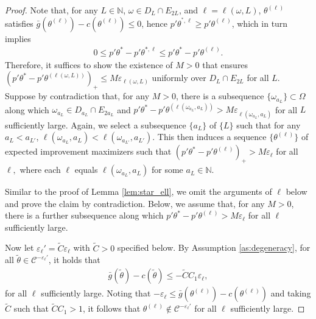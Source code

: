 \documentclass[letterpaper,11pt]{article}
\theoremstyle{myplain}
\theoremstyle{mydefinition}
\theoremstyle{myremark}
\numberwithin{equation}{section}
\numberwithin{figure}{section}
\begin{document}
\begin{appendix}
\begin{proof}
Note that, for any $L\in\mathbb N$, $\omega\in D_L\cap E_{2L}$, and $\ell=\ell(\omega,L)$, $\theta^{(\ell)}$ satisfies $\bar g(\theta^{(\ell)})-c(\theta^{(\ell)})\le 0$, hence $p'\theta^{^*,\ell}\ge p'\theta^{(\ell)}$, which in turn implies
\begin{align}
0\le p'\theta^*-p'\theta^{*,\ell}\le p'\theta^*-p'\theta^{(\ell)}.
\end{align}
Therefore, it suffices to show the existence of $M>0$ that ensures $(p'\theta^*-p'\theta^{(\ell(\omega,L))})_+\le M\varepsilon_{\ell(\omega,L)}$ uniformly over $D_L\cap E_{2L}$ for all $L$.
Suppose by contradiction that, for any $M>0$, there is a  subsequence $\{\omega_{a_L}\}\subset \Omega$ along which $\omega_{a_L}\in D_{a_L}\cap E_{2a_L}$ and $p'\theta^*-p'\theta^{(\ell(\omega_{a_L},a_L))}>M\varepsilon_{\ell(\omega_{a_L},a_L)}$ for all $L$ sufficiently large. Again, we select a subsequence $\{a_L\}$ of $\{L\}$  such that
for any $a_L<a_{L'}$, $\ell(\omega_{a_L},a_L)<\ell(\omega_{a_{L'}},a_{L'})$. This then  induces a sequence $\{\theta^{(\ell)}\}$ of expected improvement maximizers such that    $(p'\theta^*-p'\theta^{(\ell)})_+>M\varepsilon_\ell$ for all $\ell,$ where each $\ell$ equals $\ell(\omega_{a_L},a_L)$ for some $a_L\in\mathbb N$.

Similar to the proof of Lemma \ref{lem:star_ell}, we omit the arguments of $\ell$ below and prove the claim by contradiction.
Below, we assume that, for any $M>0$, there is a further subsequence along which $p'\theta^*-p'\theta^{(\ell)}>M\varepsilon_\ell$ for all $\ell$ sufficiently large.

Now let $\varepsilon_\ell'=\tilde C \varepsilon_\ell$ with $\tilde C>0$ specified below. By Assumption \ref{as:degeneracy}, for all $\tilde\theta\in\mathcal C^{-\varepsilon_\ell'}$, it holds that
\begin{align}
\bar g(\tilde\theta)-c(\tilde \theta)\le -\tilde C C_1 \varepsilon_\ell,
\end{align}
for all $\ell$ sufficiently large. Noting that $-\varepsilon_\ell\le \bar g(\theta^{(\ell)})-c(\theta^{(\ell)})$  and  taking $\tilde C$ such that $\tilde CC_1>1$, it follows that $\theta^{(\ell)}\notin \mathcal C^{-\varepsilon_\ell'}$ for all $\ell$ sufficiently large.


\end{proof}
\end{appendix}
\end{document}
